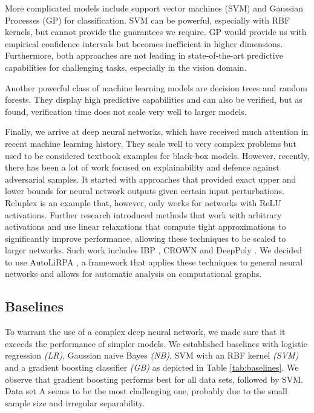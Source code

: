 \documentclass[acmsmall,nonacm]{acmart}
\begin{document}
More complicated models include support vector machines (SVM) and Gaussian Processes (GP) for classification. SVM can be powerful, especially with RBF kernels, but cannot provide the guarantees we require. GP would provide us with empirical confidence intervals but becomes inefficient in higher dimensions. Furthermore, both approaches are not leading in state-of-the-art predictive capabilities for challenging tasks, especially in the vision domain.

Another powerful class of machine learning models are decision trees and random forests. They display high predictive capabilities and can also be verified, but as \cite{tornblom2018formal} found, verification time does not scale very well to larger models.

Finally, we arrive at deep neural networks, which have received much attention in recent machine learning history. They scale well to very complex problems but used to be considered textbook examples for black-box models. However, recently, there has been a lot of work focused on explainability and defence against adversarial samples. It started with approaches that provided exact upper and lower bounds for neural network outputs given certain input perturbations. Reluplex \cite{katz2017reluplex} is an example that, however, only works for networks with ReLU activations. Further research introduced methods that work with arbitrary activations and use linear relaxations that compute tight approximations to significantly improve performance, allowing these techniques to be scaled to larger networks. Such work includes IBP \cite{gowal2019effectivenessIBP}, CROWN \cite{zhang2018efficient} and DeepPoly \cite{singh2019abstractDeepPoly}. We decided to use AutoLiRPA \cite{xu2020autoLiRPA}, a framework that applies these techniques to general neural networks and allows for automatic analysis on computational graphs.

\subsection{Baselines} \label{ssec:baselines}

To warrant the use of a complex deep neural network, we made sure that it exceeds the performance of simpler models. We established baselines with logistic regression \textit{(LR)}, Gaussian naive Bayes \textit{(NB)}, SVM with an RBF kernel \textit{(SVM)} and a gradient boosting classifier \textit{(GB)} as depicted in Table \ref{tab:baselines}. We observe that gradient boosting performs best for all data sets, followed by SVM. Data set A seems to be the most challenging one, probably due to the small sample size and irregular separability.
\end{document}
